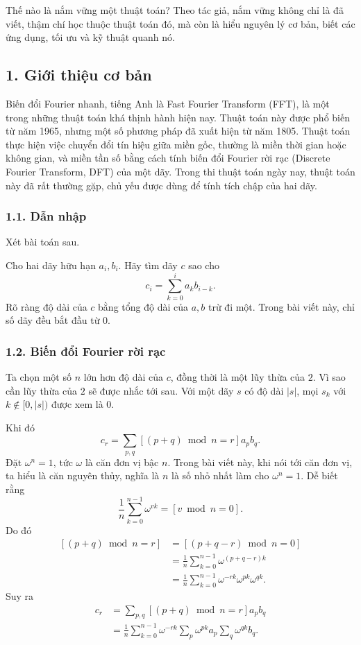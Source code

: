\documentclass[11pt]{article}
\begin{document}
Thế nào là nắm vững một thuật toán? Theo tác giả, nắm vững không chỉ là đã
viết, thậm chí học thuộc thuật toán đó, mà còn là hiểu nguyên lý cơ bản, biết
các ứng dụng, tối ưu và kỹ thuật quanh nó.

\subsection*{1. Giới thiệu cơ bản}

Biến đổi Fourier nhanh, tiếng Anh là Fast Fourier Transform (FFT), là một
trong những thuật toán khá thịnh hành hiện nay. Thuật toán này được phổ biến
từ năm 1965, nhưng một số phương pháp đã xuất hiện từ năm 1805. Thuật toán
thực hiện việc chuyển đổi tín hiệu giữa miền gốc, thường là miền thời gian
hoặc không gian, và miền tần số bằng cách tính biến đổi Fourier rời rạc
(Discrete Fourier Transform, DFT) của một dãy. Trong thi thuật toán ngày nay,
thuật toán này đã rất thường gặp, chủ yếu được dùng để tính tích chập của hai
dãy.

\subsubsection*{1.1. Dẫn nhập}

Xét bài toán sau.

Cho hai dãy hữu hạn \(a_i,b_i\). Hãy tìm dãy \(c\) sao cho
\[
  c_i=\sum_{k=0}^{i}a_k b_{i-k}.
\]
Rõ ràng độ dài của \(c\) bằng tổng độ dài của \(a,b\) trừ đi một. Trong bài
viết này, chỉ số dãy đều bắt đầu từ \(0\).

\subsubsection*{1.2. Biến đổi Fourier rời rạc}

Ta chọn một số \(n\) lớn hơn độ dài của \(c\), đồng thời là một lũy thừa của
\(2\). Vì sao cần lũy thừa của \(2\) sẽ được nhắc tới sau. Với một dãy \(s\)
có độ dài \(|s|\), mọi \(s_k\) với \(k\notin[0,|s|)\) được xem là \(0\).

Khi đó
\[
  c_r=\sum_{p,q}[(p+q)\bmod n=r]a_p b_q. \tag{1.1}
\]
Đặt \(\omega^n=1\), tức \(\omega\) là căn đơn vị bậc \(n\). Trong bài viết
này, khi nói tới căn đơn vị, ta hiểu là căn nguyên thủy, nghĩa là \(n\) là số
nhỏ nhất làm cho \(\omega^n=1\). Dễ biết rằng
\[
  \frac{1}{n}\sum_{k=0}^{n-1}\omega^{vk}=[v\bmod n=0]. \tag{1.2}
\]
Do đó
\[
\begin{aligned}
[(p+q)\bmod n=r]
  &= [(p+q-r)\bmod n=0]\\
  &= \frac{1}{n}\sum_{k=0}^{n-1}\omega^{(p+q-r)k}\\
  &= \frac{1}{n}\sum_{k=0}^{n-1}\omega^{-rk}\omega^{pk}\omega^{qk}.
\end{aligned}
\]
Suy ra
\[
\begin{aligned}
c_r
  &= \sum_{p,q}[(p+q)\bmod n=r]a_p b_q\\
  &= \frac{1}{n}\sum_{k=0}^{n-1}\omega^{-rk}
     \sum_p\omega^{pk}a_p\sum_q\omega^{qk}b_q.
\end{aligned}
\]
\end{document}
